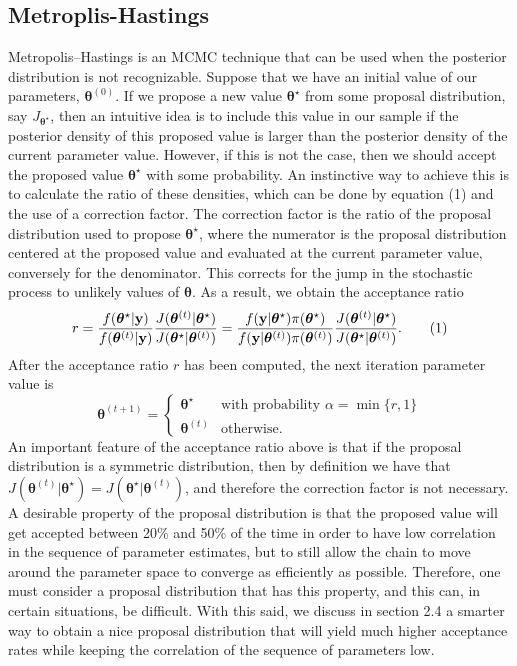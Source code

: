 \documentclass[12pt]{extarticle}
\begin{document}
\subsection{Metroplis-Hastings}
\noindent Metropolis--Hastings is an MCMC technique that can be used when the posterior distribution is not recognizable.  Suppose that we have an initial value of our parameters, $\boldsymbol\theta^{(0)}$.  If we propose a new value $\boldsymbol\theta^\star$ from some proposal distribution, say $J_{\boldsymbol\theta^\star}$, then an intuitive idea is to include this value in our sample if the posterior density of this proposed value is larger than the posterior density of the current parameter value.  However, if this is not the case, then we should accept the proposed value $\boldsymbol\theta^\star$ with some probability.  An instinctive way to achieve this is to calculate the ratio of these densities, which can be done by equation (1) and the use of a correction factor.  The correction factor is the ratio of the proposal distribution used to propose $\boldsymbol\theta^\star$, where the numerator is the proposal distribution centered at the proposed value and evaluated at the current parameter value, conversely for the denominator.  This corrects for the jump in the stochastic process to unlikely values of $\bm\theta$.  As a result, we obtain the acceptance ratio
\begin{align*}
r = \frac{f(\boldsymbol\theta^\star | {\bf y})}{f(\boldsymbol\theta^{(t)}|{\bf y})}\frac{J(\boldsymbol\theta^{(t)}|\boldsymbol\theta^\star)}{J(\boldsymbol\theta^\star|\boldsymbol\theta^{(t)})} = \frac{f({\bf y}|\boldsymbol\theta^\star)\pi(\boldsymbol\theta^\star)}{f({\bf y}|\boldsymbol\theta^{(t)})\pi(\boldsymbol\theta^{(t)})}\frac{J(\boldsymbol\theta^{(t)}|\boldsymbol\theta^\star)}{J(\boldsymbol\theta^\star|\boldsymbol\theta^{(t)})}. \tag{1}
\end{align*}
After the acceptance ratio $r$ has been computed, the next iteration parameter value is
\[ \boldsymbol\theta^{(t+1)} = \begin{cases} 
     \boldsymbol\theta^\star & \text{with probability $\alpha = \min\{r,1\}$} \\
     \boldsymbol\theta^{(t)} & \text{otherwise}.
   \end{cases} \tag{2}
\]
An important feature of the acceptance ratio above is that if the proposal distribution is a symmetric distribution, then by definition we have that $J(\boldsymbol\theta^{(t)}|\boldsymbol\theta^\star) = J(\boldsymbol\theta^\star|\boldsymbol\theta^{(t)})$, and therefore the correction factor is not necessary.  A desirable property of the proposal distribution is that the proposed value will get accepted between 20$\%$ and 50$\%$ of the time in order to have low correlation in the sequence of parameter estimates, but to still allow the chain to move around the parameter space to converge as efficiently as possible.  Therefore, one must consider a proposal distribution that has this property, and this can, in certain situations, be difficult.  With this said, we discuss in section 2.4 a smarter way to obtain a nice proposal distribution that will yield much higher acceptance rates while keeping the correlation of the sequence of parameters low.
\end{document}
